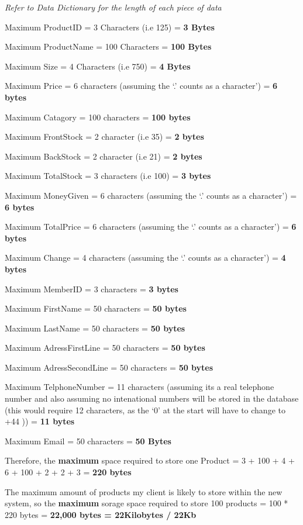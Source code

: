 \begin{flushleft}
\textit{Refer to Data Dictionary for the length of each piece of data} \par

Maximum ProductID = 3 Characters (i.e 125) = \textbf{3 Bytes}\par
Maximum ProductName = 100 Characters = \textbf{100 Bytes}\par
Maximum Size = 4 Characters (i.e 750) = \textbf{4 Bytes} \par
Maximum Price = 6 characters (assuming the `.' counts as a character') = \textbf{6 bytes} \par
Maximum Catagory  = 100 characters = \textbf{100 bytes} \par
Maximum FrontStock = 2 character (i.e 35) = \textbf{2 bytes} \par
Maximum BackStock = 2 character (i.e 21) = \textbf{2 bytes} \par
Maximum TotalStock = 3 characters (i.e 100) = \textbf{3 bytes} \par
Maximum MoneyGiven = 6 characters (assuming the `.' counts as a character') = \textbf{6 bytes} \par
Maximum TotalPrice = 6 characters (assuming the `.' counts as a character') = \textbf{6 bytes} \par
Maximum Change = 4 characters (assuming the `.' counts as a character') = \textbf{4 bytes} \par
Maximum MemberID = 3 characters = \textbf{3 bytes} \par
Maximum FirstName  = 50 characters = \textbf{50 bytes} \par
Maximum LastName  = 50 characters = \textbf{50 bytes} \par 
Maximum AdressFirstLine = 50 characters = \textbf{50 bytes} \par
Maximum AdressSecondLine = 50 characters = \textbf{50 bytes} \par
Maximum TelphoneNumber = 11 characters (assuming its a real telephone number and also assuming no intenational numbers will be stored in the database (this would require 12 characters, as the `0' at the start will have to change to +44 )) = \textbf{11 bytes} \par
Maximum Email = 50 characters = \textbf{50 Bytes} \par

Therefore, the \textbf{maximum} space required to store one Product = 3 + 100 + 4 + 6 + 100 + 2 + 2 + 3 = \textbf{220 bytes}

The maximum amount of products my client is likely to store within the new system, so the \textbf{maximum} sorage space required to store 100 products = 100 * 220 bytes = \textbf{22,000 bytes = 22Kilobytes / 22Kb}


\end{flushleft}
